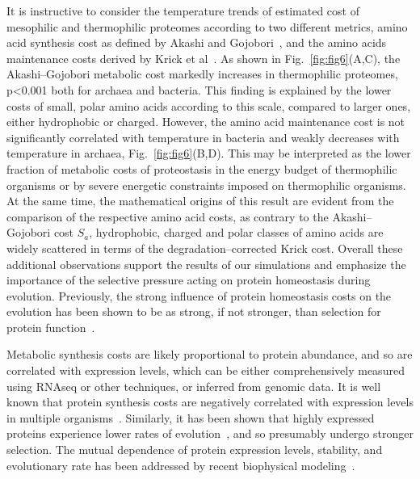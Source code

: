 \documentclass[10pt,letterpaper]{article}
\begin{document}
It is instructive to consider the temperature trends of estimated cost of mesophilic and thermophilic proteomes according to two different metrics, amino acid synthesis cost as defined by Akashi and Gojobori~\cite{Akashi2002Metabolic}, and the amino acids maintenance costs derived by Krick et al~\cite{Krick2014Amino}. As shown in Fig.~\ref{fig:fig6}(A,C), the Akashi--Gojobori metabolic cost markedly increases in thermophilic proteomes, p\textless0.001 both for archaea and bacteria. This finding is explained by the lower costs of small, polar amino acids according to this scale, compared to larger ones, either hydrophobic or charged. However, the amino acid maintenance cost is not significantly correlated with temperature in bacteria and weakly decreases with temperature in archaea, Fig.~\ref{fig:fig6}(B,D). This may be interpreted as the lower fraction of metabolic costs  of proteostasis in the energy budget of thermophilic organisms or by severe energetic constraints imposed on thermophilic organisms. At the same time, the mathematical origins of this result are evident from the comparison of the respective amino acid costs, as contrary to the Akashi--Gojobori cost $S_{a}$, hydrophobic, charged and polar classes of amino acids are widely scattered in terms of the degradation--corrected Krick cost. Overall these additional observations support the results of our simulations and emphasize the importance of the selective pressure acting on protein homeostasis during evolution. Previously, the strong influence of protein homeostasis costs on the evolution has been shown to be as strong, if not stronger, than selection for protein function~\cite{Assis2014Conserved}.

Metabolic synthesis costs are likely proportional to protein abundance, and so are correlated with expression levels, which can be either comprehensively measured using RNAseq or other techniques, or inferred from genomic data. It is well known that protein synthesis costs are negatively correlated with expression levels in multiple organisms~\cite{Akashi2002Metabolic,Seligmann2003CostMinimization,Heizer2006Amino,Raiford2008Do}. Similarly, it has been shown that highly expressed proteins experience lower rates of evolution~\cite{Pal2001Highly,Rocha2004An,Drummond2005Why}, and so presumably undergo stronger selection. The mutual dependence of protein expression levels, stability, and evolutionary rate has been addressed by recent biophysical modeling~\cite{Serohijos2012Protein}.
\end{document}
